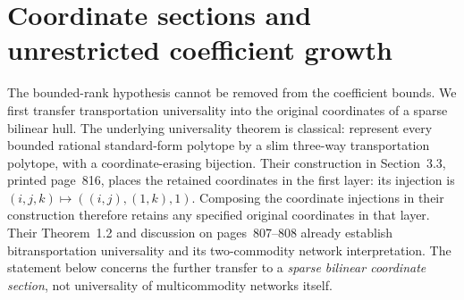 \section{Coordinate sections and unrestricted coefficient growth}\label{sec:universality}

The bounded-rank hypothesis cannot be removed from the coefficient bounds.
We first transfer transportation universality into the original coordinates
of a sparse bilinear hull. The underlying universality theorem is classical:
\citet[Theorem~1.1]{DeLoeraOnn2006} represent every bounded rational
standard-form polytope by a slim three-way transportation polytope, with a
coordinate-erasing bijection. Their construction in Section~3.3, printed
page~816, places the retained coordinates in the first layer: its injection
is $(i,j,k)\mapsto((i,j),(1,k),1)$. Composing the coordinate injections in
their construction therefore retains any specified original coordinates
in that layer. Their Theorem~1.2 and discussion on pages~807--808 already
establish bitransportation universality and its two-commodity network
interpretation. The statement below concerns the further transfer to a
\emph{sparse bilinear coordinate section}, not universality of
multicommodity networks itself.

